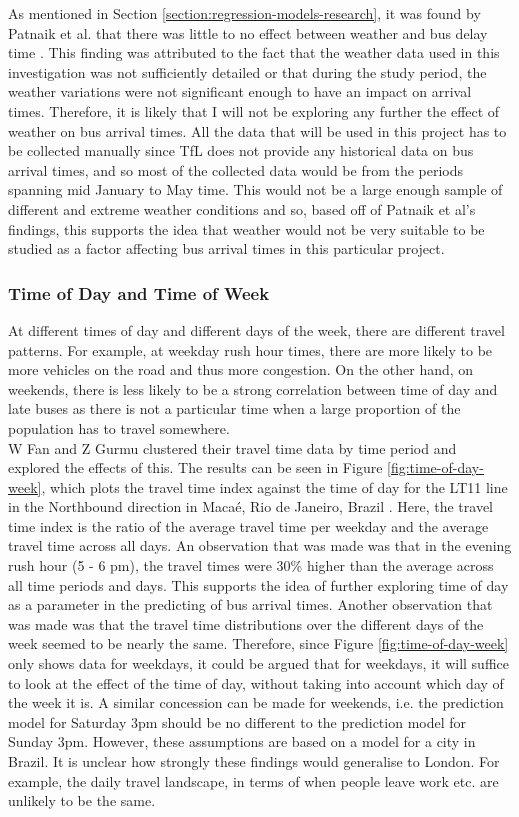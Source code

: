 As mentioned in Section \ref{section:regression-models-research}, it was found by Patnaik et al. that there was little to no effect between weather and bus delay time \cite{apc-estimation}. This finding was attributed to the fact that the weather data used in this investigation was not sufficiently detailed or that during the study period, the weather variations were not significant enough to have an impact on arrival times. Therefore, it is likely that I will not be exploring any further the effect of weather on bus arrival times. All the data that will be used in this project has to be collected manually since TfL does not provide any historical data on bus arrival times, and so most of the collected data would be from the periods spanning mid January to May time. This would not be a large enough sample of different and extreme weather conditions and so, based off of Patnaik et al's findings, this supports the idea that weather would not be very suitable to be studied as a factor affecting bus arrival times in this particular project.

\subsubsection{Time of Day and Time of Week}
\label{time-of-day-week}
At different times of day and different days of the week, there are different travel patterns. For example, at weekday rush hour times, there are more likely to be more vehicles on the road and thus more congestion. On the other hand, on weekends, there is less likely to be a strong correlation between time of day and late buses as there is not a particular time when a large proportion of the population has to travel somewhere. \\

W Fan and Z Gurmu clustered their travel time data by time period and explored the effects of this. The results can be seen in Figure \ref{fig:time-of-day-week}, which plots the travel time index against the time of day for the LT11 line in the Northbound direction in Maca\'e, Rio de Janeiro, Brazil \cite{dynamic-gps}. Here, the travel time index is the ratio of the average travel time per weekday and the average travel time across all days. An observation that was made was that in the evening rush hour (5 - 6 pm), the travel times were 30\% higher than the average across all time periods and days. This supports the idea of further exploring time of day as a parameter in the predicting of bus arrival times. Another observation that was made was that the travel time distributions over the different days of the week seemed to be nearly the same. Therefore, since Figure \ref{fig:time-of-day-week} only shows data for weekdays, it could be argued that for weekdays, it will suffice to look at the effect of the time of day, without taking into account which day of the week it is. A similar concession can be made for weekends, i.e. the prediction model for Saturday 3pm should be no different to the prediction model for Sunday 3pm. However, these assumptions are based on a model for a city in Brazil. It is unclear how strongly these findings would generalise to London. For example, the daily travel landscape, in terms of when people leave work etc. are unlikely to be the same.

